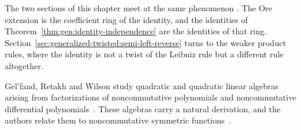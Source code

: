 The two sections of this chapter meet at the same phenomenon
\cite[p.~172]{ChuangLee2010Higher}. The Ore extension is the coefficient
ring of the identity, and the identities of
Theorem~\ref{thm:gen:identity-independence} are the identities of that ring.
Section~\ref{sec:generalized-twisted:semi-left-reverse} turns to the weaker
product rules, where the identity is not a twist of the Leibniz rule but a
different rule altogether.

Gel'fand, Retakh and Wilson study quadratic and quadratic linear algebras
arising from factorizations of noncommutative polynomials and noncommutative
differential polynomials~\cite{WlQuadraticLinearAlgebrasAssocia2001}. These algebras carry a natural derivation, and the
authors relate
them to noncommutative symmetric
functions~\cite{WlQuadraticLinearAlgebrasAssocia2001}.
